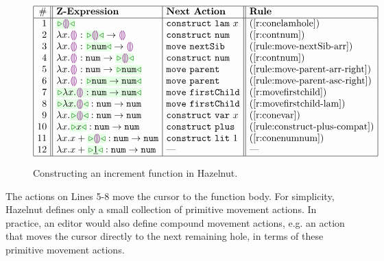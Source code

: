 \begin{figure}[t!]
\begin{center}
$\arraycolsep=4px
\begin{array}{|r||l|l||l|l|}
\hline
\# & \textbf{Z-Expression} &
\textbf{Next Action} & \textbf{Rule}
\\
\hline
1 &
\zwsel{\hhole{}} &
\aConstruct{\flam{x}} &
\text{(\ref{r:conelamhole})}
\\ 2 &
\hlam{x}{\hhole{}} : \tarr{\zwsel{\hhole{}}}{\hhole{}} &
\aConstruct{\fnum{}} &
\text{(\ref{r:contnum})}
\\ 3 &
\hlam{x}{\hhole{}} : \tarr{\zwsel{\tnum{}}}{\hhole{}} &
\aMove{\dNext{}} &
\text{({\ref{rule:move-nextSib-arr}})}
\\ 4 &
\hlam{x}{\hhole{}} : \tarr{\tnum}{\zwsel{\hhole{}}}
&
\aConstruct{\fnum{}} &
\text{(\ref{r:contnum})}
\\ 5 &
\hlam{x}{\hhole{}} : \tarr{\tnum{}}{\zwsel{\tnum{}}} &
\aMove{\dParent{}} &
\text{(\ref{rule:move-parent-arr-right})}
\\ 6 &
\hlam{x}{\hhole{}} : \zwsel{\tarr{\tnum{}}{\tnum{}}}
&
\aMove{\dParent{}} &
\text{(\ref{rule:move-parent-asc-right})}
\\ 7 &
\zwsel{\hlam{x}{\hhole{}} : \tarr{\tnum}{\tnum}} &
\aMove{\dChild} &
\text{(\ref{r:movefirstchild})}
\\ 8 &
\zwsel{\hlam{x}{\hhole{}}} : \tarr{\tnum{}}{\tnum{}} &
\aMove{\dChild{}} &
\text{(\ref{r:movefirstchild-lam})}
\\ 9 &
\hlam{x}{\zwsel{\hhole{}}} : \tarr{\tnum{}}{\tnum{}} &
\aConstruct{\fvar{x}} &
\text{(\ref{r:conevar})}
\\ 10 &
\hlam{x}{\zwsel{{x}}} : \tarr{\tnum{}}{\tnum{}} &
{\aConstruct{\fplus}}
&
\text{(\ref{rule:construct-plus-compat})}
\\ 11 &
\hlam{x}{\hadd{x}{\zwsel{\hhole{}}}} : \tarr{\tnum{}}{\tnum{}} &
\aConstruct{\fnumlit{1}} &
\text{(\ref{r:conenumnum})}
\\ 12 &
\hlam{x}{\hadd{x}{\zwsel{\hnum{1}}}} : \tarr{\tnum}{\tnum} &
\textrm{---} &
{\textrm{---}}
\\ \hline
\end{array}
$\end{center}\vspace{-6px}
\caption{Constructing an increment function in Hazelnut.}
\label{fig:first-example}
\end{figure}

The actions on Lines 5-8 move the cursor to the function body. For
simplicity, Hazelnut defines only a small collection of primitive movement
actions. In practice, an editor would also define compound movement
actions, e.g. an action that moves the cursor directly to the next
remaining hole, in terms of these primitive movement actions.

